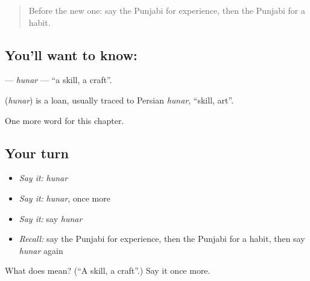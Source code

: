 \label{lesson:PA-C111-hunar}



\begin{quote}
Before the new one: say the Punjabi for experience, then the Punjabi for a habit.
\end{quote}

\subsection*{You'll want to know: }
\textbf{} — \emph{hunar} — \textquotedblleft{}a skill, a craft\textquotedblright{}.

\begin{cousinweb}
\textbf{} (\emph{hunar}) is a loan, usually traced to Persian \emph{hunar}, \textquotedblleft{}skill, art\textquotedblright{}.
\end{cousinweb}

\begin{grammarlens}[title={What you've built}]
One more word for this chapter.
\end{grammarlens}

\subsection*{Your turn}
\begin{itemize}
\raggedright
  \item \emph{Say it:} \emph{hunar}
  \item \emph{Say it:} \emph{hunar}, once more
  \item \emph{Say it:} say \emph{hunar}
  \item \emph{Recall:} say the Punjabi for experience, then the Punjabi for a habit, then say \emph{hunar} again
\end{itemize}

\begin{tcolorbox}[breakable,colback=teal!4,colframe=teal!35!black,title={Before you move on}]
What does  mean? (\textquotedblleft{}A skill, a craft\textquotedblright{}.) Say it once more.
\end{tcolorbox}
